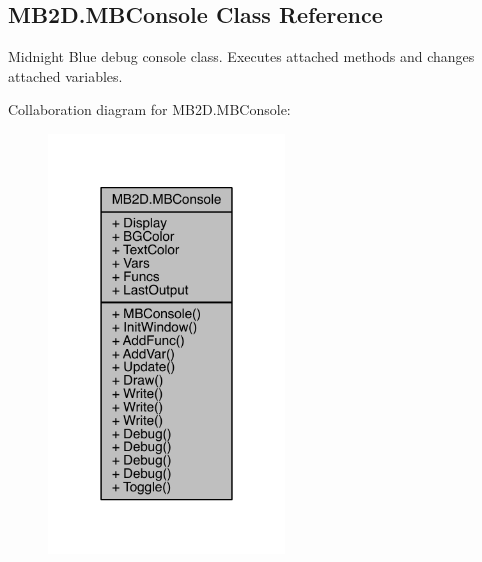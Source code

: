 \hypertarget{class_m_b2_d_1_1_m_b_console}{}\subsection{M\+B2\+D.\+M\+B\+Console Class Reference}
\label{class_m_b2_d_1_1_m_b_console}


Midnight Blue debug console class. Executes attached methods and changes attached variables.  




Collaboration diagram for M\+B2\+D.\+M\+B\+Console\+:
\nopagebreak
\begin{figure}[H]
\begin{center}
\leavevmode
\includegraphics[width=178pt]{class_m_b2_d_1_1_m_b_console__coll__graph}
\end{center}
\end{figure}
